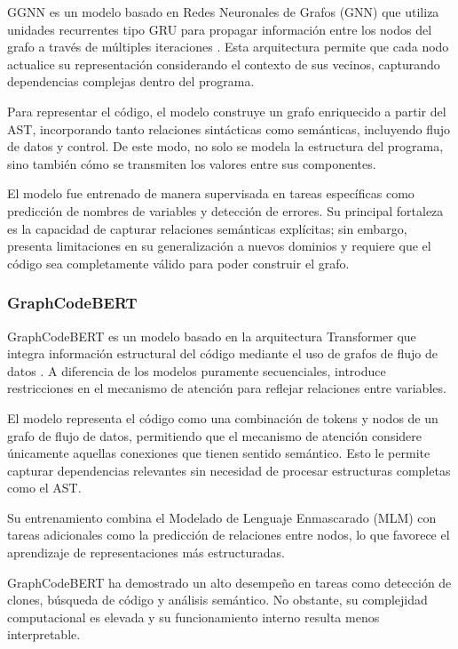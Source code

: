 GGNN es un modelo basado en Redes Neuronales de Grafos (GNN) que utiliza unidades recurrentes tipo GRU para propagar información entre los nodos del grafo a través de múltiples iteraciones \cite{Allamanis2018Graphs}. Esta arquitectura permite que cada nodo actualice su representación considerando el contexto de sus vecinos, capturando dependencias complejas dentro del programa.

Para representar el código, el modelo construye un grafo enriquecido a partir del AST, incorporando tanto relaciones sintácticas como semánticas, incluyendo flujo de datos y control. De este modo, no solo se modela la estructura del programa, sino también cómo se transmiten los valores entre sus componentes.

El modelo fue entrenado de manera supervisada en tareas específicas como predicción de nombres de variables y detección de errores. Su principal fortaleza es la capacidad de capturar relaciones semánticas explícitas; sin embargo, presenta limitaciones en su generalización a nuevos dominios y requiere que el código sea completamente válido para poder construir el grafo.

\subsubsection{GraphCodeBERT}

GraphCodeBERT es un modelo basado en la arquitectura Transformer que integra información estructural del código mediante el uso de grafos de flujo de datos \cite{Guo2021GraphCodeBERT}. A diferencia de los modelos puramente secuenciales, introduce restricciones en el mecanismo de atención para reflejar relaciones entre variables.

El modelo representa el código como una combinación de tokens y nodos de un grafo de flujo de datos, permitiendo que el mecanismo de atención considere únicamente aquellas conexiones que tienen sentido semántico. Esto le permite capturar dependencias relevantes sin necesidad de procesar estructuras completas como el AST.

Su entrenamiento combina el Modelado de Lenguaje Enmascarado (MLM) con tareas adicionales como la predicción de relaciones entre nodos, lo que favorece el aprendizaje de representaciones más estructuradas.

GraphCodeBERT ha demostrado un alto desempeño en tareas como detección de clones, búsqueda de código y análisis semántico. No obstante, su complejidad computacional es elevada y su funcionamiento interno resulta menos interpretable.

